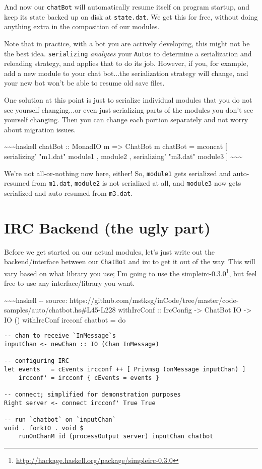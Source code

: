 \documentclass[]{article}
\renewcommand{\href}[2]{#2\footnote{\url{#1}}}
\begin{document}
And now our \texttt{chatBot} will automatically resume itself on program
startup, and keep its state backed up on disk at \texttt{state.dat}. We get this
for free, without doing anything extra in the composition of our modules.

Note that in practice, with a bot you are actively developing, this might not be
the best idea. \texttt{serializing\textquotesingle{}} \emph{analyzes} your
\texttt{Auto}s to determine a serialization and reloading strategy, and applies
that to do its job. However, if you, for example, add a new module to your chat
bot...the serialization strategy will change, and your new bot won't be able to
resume old save files.

One solution at this point is just to serialize individual modules that you do
not see yourself changing...or even just serializing parts of the modules you
don't see yourself changing. Then you can change each portion separately and not
worry about migration issues.

\textasciitilde{}\textasciitilde{}\textasciitilde{}haskell chatBot :: MonadIO m
=\textgreater{} ChatBot m chatBot = mconcat {[} serializing' "m1.dat" module1 ,
module2 , serializing' "m3.dat" module3 {]}
\textasciitilde{}\textasciitilde{}\textasciitilde{}

We're not all-or-nothing now here, either! So, \texttt{module1} gets serialized
and auto-resumed from \texttt{m1.dat}, \texttt{module2} is not serialized at
all, and \texttt{module3} now gets serialized and auto-resumed from
\texttt{m3.dat}.

\section{IRC Backend (the ugly part)}

Before we get started on our actual modules, let's just write out the
backend/interface between our \texttt{ChatBot} and irc to get it out of the way.
This will vary based on what library you use; I'm going to use the
\href{http://hackage.haskell.org/package/simpleirc-0.3.0}{simpleirc-0.3.0}, but
feel free to use any interface/library you want.

\textasciitilde{}\textasciitilde{}\textasciitilde{}haskell -\/- source:
https://github.com/mstksg/inCode/tree/master/code-samples/auto/chatbot.hs\#L45-L228
withIrcConf :: IrcConfig -\textgreater{} ChatBot IO -\textgreater{} IO ()
withIrcConf ircconf chatbot = do

\begin{verbatim}
-- chan to receive `InMessage`s
inputChan <- newChan :: IO (Chan InMessage)

-- configuring IRC
let events   = cEvents ircconf ++ [ Privmsg (onMessage inputChan) ]
    ircconf' = ircconf { cEvents = events }

-- connect; simplified for demonstration purposes
Right server <- connect ircconf' True True

-- run `chatbot` on `inputChan`
void . forkIO . void $
    runOnChanM id (processOutput server) inputChan chatbot
\end{verbatim}
\end{document}
